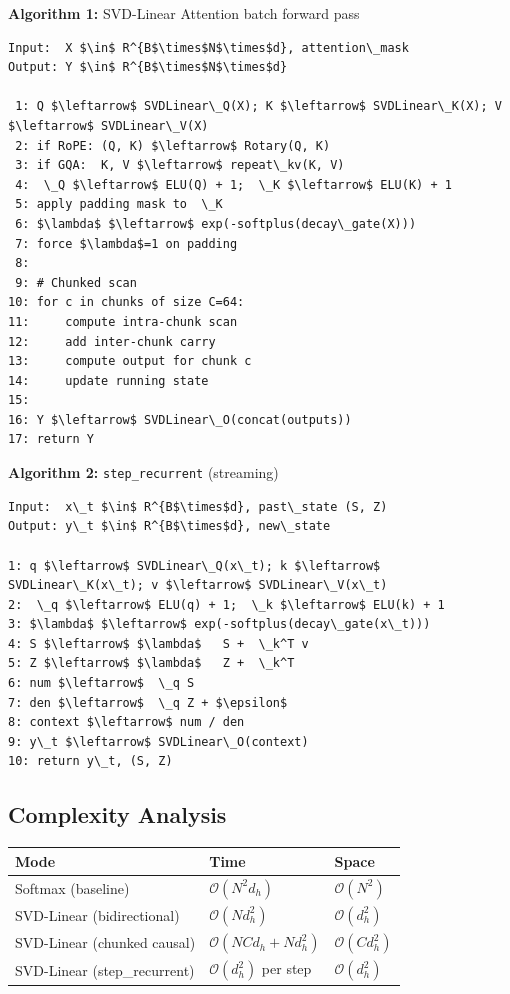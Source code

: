 \textbf{Algorithm 1:} SVD-Linear Attention batch forward pass
\begin{lstlisting}
Input:  X $\in$ R^{B$\times$N$\times$d}, attention\_mask
Output: Y $\in$ R^{B$\times$N$\times$d}

 1: Q $\leftarrow$ SVDLinear\_Q(X); K $\leftarrow$ SVDLinear\_K(X); V $\leftarrow$ SVDLinear\_V(X)
 2: if RoPE: (Q, K) $\leftarrow$ Rotary(Q, K)
 3: if GQA:  K, V $\leftarrow$ repeat\_kv(K, V)
 4:  \_Q $\leftarrow$ ELU(Q) + 1;  \_K $\leftarrow$ ELU(K) + 1
 5: apply padding mask to  \_K
 6: $\lambda$ $\leftarrow$ exp(-softplus(decay\_gate(X)))
 7: force $\lambda$=1 on padding
 8:
 9: # Chunked scan
10: for c in chunks of size C=64:
11:     compute intra-chunk scan
12:     add inter-chunk carry
13:     compute output for chunk c
14:     update running state
15:
16: Y $\leftarrow$ SVDLinear\_O(concat(outputs))
17: return Y
\end{lstlisting}

\textbf{Algorithm 2:} \texttt{step\_recurrent} (streaming)
\begin{lstlisting}
Input:  x\_t $\in$ R^{B$\times$d}, past\_state (S, Z)
Output: y\_t $\in$ R^{B$\times$d}, new\_state

1: q $\leftarrow$ SVDLinear\_Q(x\_t); k $\leftarrow$ SVDLinear\_K(x\_t); v $\leftarrow$ SVDLinear\_V(x\_t)
2:  \_q $\leftarrow$ ELU(q) + 1;  \_k $\leftarrow$ ELU(k) + 1
3: $\lambda$ $\leftarrow$ exp(-softplus(decay\_gate(x\_t)))
4: S $\leftarrow$ $\lambda$   S +  \_k^T v
5: Z $\leftarrow$ $\lambda$   Z +  \_k^T
6: num $\leftarrow$  \_q S
7: den $\leftarrow$  \_q Z + $\epsilon$
8: context $\leftarrow$ num / den
9: y\_t $\leftarrow$ SVDLinear\_O(context)
10: return y\_t, (S, Z)
\end{lstlisting}

\subsection{Complexity Analysis}

\begin{table}[H]
\centering
\small
\begin{tabular}{lll}
\toprule
\textbf{Mode} & \textbf{Time} & \textbf{Space} \\
\midrule
Softmax (baseline) & $\mathcal{O}(N^2 d_h)$ & $\mathcal{O}(N^2)$ \\
SVD-Linear (bidirectional) & $\mathcal{O}(N d_h^2)$ & $\mathcal{O}(d_h^2)$ \\
SVD-Linear (chunked causal) & $\mathcal{O}(N C d_h + N d_h^2)$ & $\mathcal{O}(C d_h^2)$ \\
SVD-Linear (step\_recurrent) & $\mathcal{O}(d_h^2)$ per step & $\mathcal{O}(d_h^2)$ \\
\bottomrule
\end{tabular}
\end{table}

